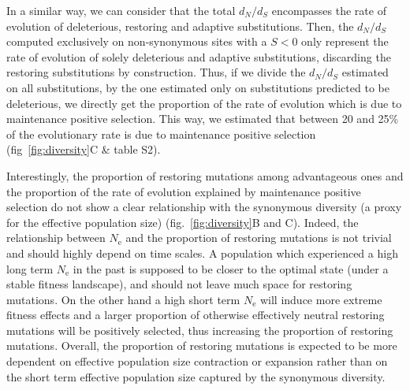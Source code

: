 \documentclass{article}
\newcommand{\Ne}{N_{\textrm{e}}}
\newcommand{\dn}{d_N}
\newcommand{\ds}{d_S}
\newcommand{\dnds}{\dn / \ds}
\newcommand{\Sphy}{S}
\begin{document}
    In a similar way, we can consider that the total $\dnds$ encompasses the rate of evolution of deleterious, restoring and adaptive substitutions.
    Then, the $\dnds$ computed exclusively on non-synonymous sites with a $\Sphy < 0$ only represent the rate of evolution of solely deleterious and adaptive substitutions, discarding the restoring substitutions by construction.
    Thus, if we divide the $\dnds$ estimated on all substitutions, by the one estimated only on substitutions predicted to be deleterious, we directly get the proportion of the rate of evolution which is due to maintenance positive selection.
    This way, we estimated that between 20 and 25\% of the evolutionary rate is due to maintenance positive selection (fig~\ref{fig:diversity}C \& table S2).

    Interestingly, the proportion of restoring mutations among advantageous ones and the proportion of the rate of evolution explained by maintenance positive selection do not show a clear relationship with the synonymous diversity (a proxy for the effective population size) (fig.~\ref{fig:diversity}B and C).
    Indeed, the relationship between $\Ne$ and the proportion of restoring mutations is not trivial and should highly depend on time scales.
    A population which experienced a high long term $\Ne$ in the past is supposed to be closer to the optimal state (under a stable fitness landscape), and should not leave much space for restoring mutations.
    On the other hand a high short term $\Ne$ will induce more extreme fitness effects and a larger proportion of otherwise effectively neutral restoring mutations will be positively selected, thus increasing the proportion of restoring mutations.
    Overall, the proportion of restoring mutations is expected to be more dependent on effective population size contraction or expansion rather than on the short term effective population size captured by the synonymous diversity.

\end{document}
